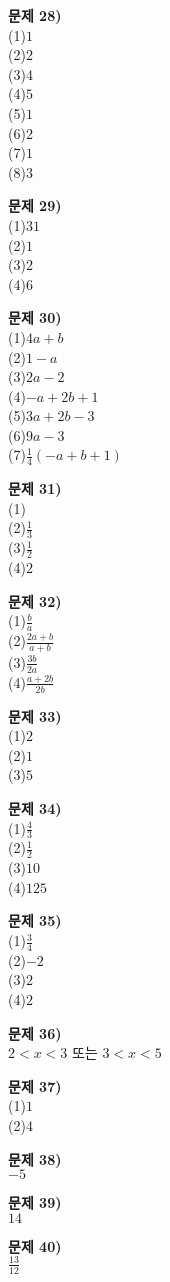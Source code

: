 \documentclass{oblivoir}
\newcommand\an[1]{\par\bigskip\noindent\textbf{문제 #1)}\\}
\begin{document}
\begin{minipage}{0.49\textwidth}
%
\an{28}
\noindent
(1)\:\:\(1\)\\
(2)\:\:\(2\)\\
(3)\:\:\(4\)\\
(4)\:\:\(5\)\\
(5)\:\:\(1\)\\
(6)\:\:\(2\)\\
(7)\:\:\(1\)\\
(8)\:\:\(3\)

%
\an{29}
\noindent
(1)\:\:\(31\)\\
(2)\:\:\(1\)\\
(3)\:\:\(2\)\\
(4)\:\:\(6\)

%
\an{30}
\noindent
(1)\:\:\(4a+b\)\\
(2)\:\:\(1-a\)\\
(3)\:\:\(2a-2\)\\
(4)\:\:\(-a+2b+1\)\\
(5)\:\:\(3a+2b-3\)\\
(6)\:\:\(9a-3\)\\
(7)\:\:\(\frac14(-a+b+1)\)

%
\an{31}
\noindent
(1)\:\\
(2)\:\:\(\frac13\)\\
(3)\:\:\(\frac12\)\\
(4)\:\:\(2\)

%
\an{32}
\noindent
(1)\:\:\(\frac ba\)\\
(2)\:\:\(\frac{2a+b}{a+b}\)\\
(3)\:\:\(\frac{3b}{2a}\)\\
(4)\:\:\(\frac{a+2b}{2b}\)
\end{minipage}
\begin{minipage}{0.49\textwidth}
%
\an{33}
\noindent
(1)\:\:\(2\)\\
(2)\:\:\(1\)\\
(3)\:\:\(5\)

%
\an{34}
\noindent
(1)\:\:\(\frac43\)\\
(2)\:\:\(\frac12\)\\
(3)\:\:\(10\)\\
(4)\:\:\(125\)

%
\an{35}
\noindent
(1)\:\:\(\frac34\)\\
(2)\:\:\(-2\)\\
(3)\:\:\(2\)\\
(4)\:\:\(2\)

%
\an{36}
\noindent
\(2< x< 3\) 또는 \(3< x< 5\)

%
\an{37}
\noindent
(1)\:\:\(1\)\\
(2)\:\:\(4\)

%
\an{38}
\noindent
\(-5\)

%
\an{39}
\noindent
\(14\)

%
\an{40}
\noindent
\(\frac{13}{12}\)

\end{minipage}
\end{document}
